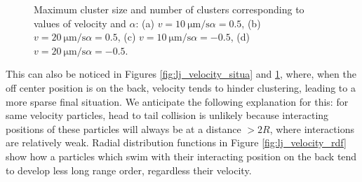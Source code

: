 \documentclass[../../master_thesis_np.tex]{subfiles}
\begin{document}
\begin{figure}[hbtp]
			\caption{Maximum cluster size and number of clusters corresponding to values of velocity and $\alpha$: (a) $v = \SI{10}{\um \per \second} \alpha = 0.5$, (b) $v = \SI{20}{\um \per \second} \alpha = 0.5$, (c) $v = \SI{10}{\um \per \second} \alpha = -0.5$, (d) $v = \SI{20}{\um \per \second} \alpha = -0.5$.}
			\label{fig:lj_velocity_cluster}
		\end{figure}

		This can also be noticed in Figures \ref{fig:lj_velocity_situa} and \ref{fig:lj_velocity_cluster}, where, when the off center position is on the back, velocity tends to hinder clustering, leading to a more sparse final situation. 
		We anticipate the following explanation for this: for same velocity particles, head to tail collision is unlikely because interacting positions of these particles will always be at a distance $> 2R$, where interactions are relatively weak.
		Radial distribution functions in Figure \ref{fig:lj_velocity_rdf} show how a particles which swim with their interacting position on the back tend to develop less long range order, regardless their velocity.
		
\end{document}
